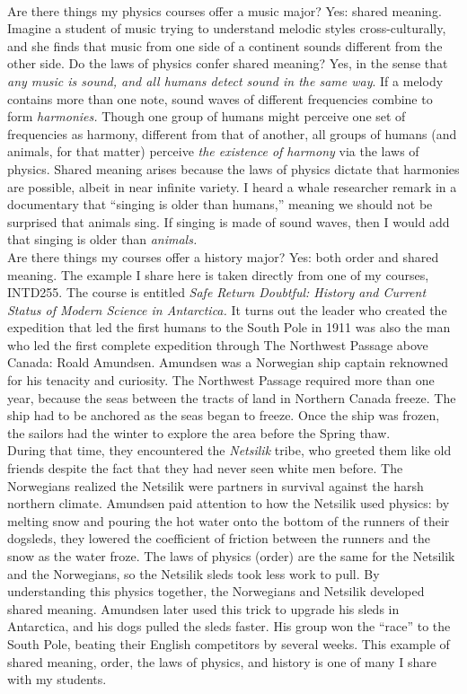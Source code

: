 \documentclass[../../../main.tex]{subfiles}
\begin{document}
\\
\vspace{0.25cm}
Are there things my physics courses offer a music major?  Yes: shared meaning.  Imagine a student of music trying to understand melodic styles cross-culturally, and she finds that music from one side of a continent sounds different from the other side.  Do the laws of physics confer shared meaning?  Yes, in the sense that \textit{any music is sound, and all humans detect sound in the same way}.  If a melody contains more than one note, sound waves of different frequencies combine to form \textit{harmonies.}  Though one group of humans might perceive one set of frequencies as harmony, different from that of another, all groups of humans (and animals, for that matter) perceive \textit{the existence of harmony} via the laws of physics.  Shared meaning arises because the laws of physics dictate that harmonies are possible, albeit in near infinite variety.  I heard a whale researcher remark in a documentary that ``singing is older than humans,'' meaning we should not be surprised that animals sing.  If singing is made of sound waves, then I would add that singing is older than \textit{animals.}
\\
\vspace{0.25cm}
Are there things my courses offer a history major?  Yes: both order and shared meaning.  The example I share here is taken directly from one of my courses, INTD255.  The course is entitled \textit{Safe Return Doubtful: History and Current Status of Modern Science in Antarctica.}  It turns out the leader who created the expedition that led the first humans to the South Pole in 1911 was also the man who led the first complete expedition through The Northwest Passage above Canada: Roald Amundsen.  Amundsen was a Norwegian ship captain reknowned for his tenacity and curiosity.  The Northwest Passage required more than one year, because the seas between the tracts of land in Northern Canada freeze.  The ship had to be anchored as the seas began to freeze.  Once the ship was frozen, the sailors had the winter to explore the area before the Spring thaw.
\\
\vspace{0.25cm}
During that time, they encountered the \textit{Netsilik} tribe, who greeted them like old friends despite the fact that they had never seen white men before.  The Norwegians realized the Netsilik were partners in survival against the harsh northern climate. Amundsen paid attention to how the Netsilik used physics: by melting snow and pouring the hot water onto the bottom of the runners of their dogsleds, they lowered the coefficient of friction between the runners and the snow as the water froze.  The laws of physics (order) are the same for the Netsilik and the Norwegians, so the Netsilik sleds took less work to pull.  By understanding this physics together, the Norwegians and Netsilik developed shared meaning.  Amundsen later used this trick to upgrade his sleds in Antarctica, and his dogs pulled the sleds faster.  His group won the ``race'' to the South Pole, beating their English competitors by several weeks.  This example of shared meaning, order, the laws of physics, and history is one of many I share with my students.
\end{document}
